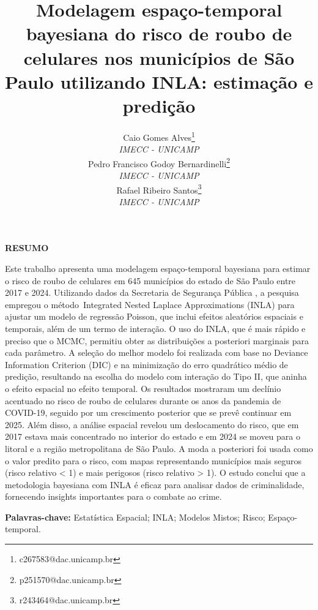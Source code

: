 \documentclass{2ssmeeting}
\begin{document}
\title{Modelagem espaço-temporal bayesiana do risco de roubo de celulares nos municípios de São Paulo utilizando INLA: estimação e predição}


\author{
    {\large Caio Gomes Alves}\thanks{c267583@dac.unicamp.br}\\
    {\small \textit{IMECC - UNICAMP}} \\
    {\large Pedro Francisco Godoy Bernardinelli}\thanks{p251570@dac.unicamp.br}\\
    {\small \textit{IMECC - UNICAMP}} \\
    {\large Rafael Ribeiro Santos}\thanks{r243464@dac.unicamp.br}\\
    {\small \textit{IMECC - UNICAMP}}
}
\criartitulo


\vspace{1cm}

\textbf{RESUMO}

\vspace{1cm}

Este trabalho apresenta uma modelagem espaço-temporal bayesiana para estimar o risco de roubo de celulares em 645 municípios do estado de São Paulo entre 2017 e 2024. Utilizando dados da Secretaria de Segurança Pública , a pesquisa empregou o método Integrated Nested Laplace Approximations (INLA) para ajustar um modelo de regressão Poisson, que inclui efeitos aleatórios espaciais e temporais, além de um termo de interação. O uso do INLA, que é mais rápido e preciso que o MCMC, permitiu obter as distribuições a posteriori marginais para cada parâmetro. A seleção do melhor modelo foi realizada com base no Deviance Information Criterion (DIC) e na minimização do erro quadrático médio de predição, resultando na escolha do modelo com interação do Tipo II, que aninha o efeito espacial no efeito temporal. Os resultados mostraram um declínio acentuado no risco de roubo de celulares durante os anos da pandemia de COVID-19, seguido por um crescimento posterior que se prevê continuar em 2025. Além disso, a análise espacial revelou um deslocamento do risco, que em 2017 estava mais concentrado no interior do estado e em 2024 se moveu para o litoral e a região metropolitana de São Paulo. A moda a posteriori foi usada como o valor predito para o risco, com mapas representando municípios mais seguros (risco relativo < 1) e mais perigosos (risco relativo > 1). O estudo conclui que a metodologia bayesiana com INLA é eficaz para analisar dados de criminalidade, fornecendo insights importantes para o combate ao crime.

\vspace{1.5em}

{\bf Palavras-chave:} Estatística Espacial; INLA; Modelos Mistos; Risco; Espaço-temporal.
\end{document}
